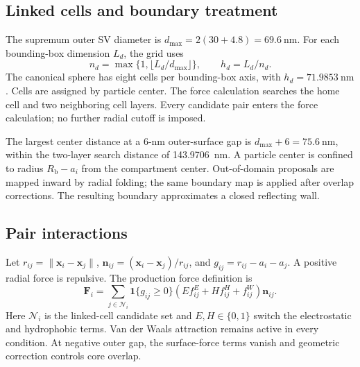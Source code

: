 \documentclass[11pt,letterpaper]{article}
\begin{document}
\subsection{Linked cells and boundary treatment}
The supremum outer SV diameter is \(d_{\max}=2(30+4.8)
=\SI{69.6}{\nano\metre}\). For each bounding-box dimension \(L_d\), the grid uses
\begin{equation}
 n_d=\max\{1,\lfloor L_d/d_{\max}\rfloor\},\qquad h_d=L_d/n_d.
 \label{eq:cells}
\end{equation}
The canonical sphere has eight cells per bounding-box axis, with
\(h_d=\SI{71.9853}{\nano\metre}\). Cells are assigned by particle center.
The force calculation searches the home cell and two neighboring cell
layers. Every candidate pair enters the force calculation; no further
radial cutoff is imposed.

The largest center distance at a 6-nm outer-surface gap is
\(d_{\max}+6=\SI{75.6}{\nano\metre}\), within the two-layer search
distance of \SI{143.9706}{\nano\metre}.
A particle center is confined to radius \(R_{\mathrm b}-a_i\) from the
compartment center. Out-of-domain proposals are mapped inward by radial
folding; the same boundary map is applied after overlap corrections.
The resulting boundary approximates a closed reflecting wall.

\subsection{Pair interactions}
Let \(r_{ij}=\lVert\bm x_i-\bm x_j\rVert\),
\(\bm n_{ij}=(\bm x_i-\bm x_j)/r_{ij}\), and
\(g_{ij}=r_{ij}-a_i-a_j\). A positive radial force is repulsive.
The production force definition is
\begin{equation}
 \bm F_i=\sum_{j\in\mathcal N_i}
 \mathbf 1\{g_{ij}\geq0\}
 \left(E f_{ij}^{E}+H f_{ij}^{H}+f_{ij}^{W}\right)\bm n_{ij}.
 \label{eq:total-force}
\end{equation}
Here \(\mathcal N_i\) is the linked-cell candidate set and
$E,H\in\{0,1\}$ switch the electrostatic and hydrophobic terms.
Van der Waals attraction remains active in every condition. At negative
outer gap, the surface-force terms vanish and geometric correction
controls core overlap.
\end{document}
